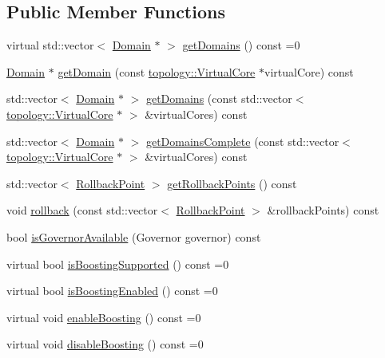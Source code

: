 \subsection*{Public Member Functions}
\begin{DoxyCompactItemize}
\item 
virtual std\-::vector$<$ \hyperlink{classmammut_1_1cpufreq_1_1Domain}{Domain} $\ast$ $>$ \hyperlink{classmammut_1_1cpufreq_1_1CpuFreq_a2ff7cb9b384f506f17340089bba3ba99}{get\-Domains} () const =0
\item 
\hyperlink{classmammut_1_1cpufreq_1_1Domain}{Domain} $\ast$ \hyperlink{classmammut_1_1cpufreq_1_1CpuFreq_aebb8f1ebd1977e817eda907c7107e672}{get\-Domain} (const \hyperlink{classmammut_1_1topology_1_1VirtualCore}{topology\-::\-Virtual\-Core} $\ast$virtual\-Core) const 
\item 
std\-::vector$<$ \hyperlink{classmammut_1_1cpufreq_1_1Domain}{Domain} $\ast$ $>$ \hyperlink{classmammut_1_1cpufreq_1_1CpuFreq_a7cdfd85b4e2d53a0aaee8261be8e3b28}{get\-Domains} (const std\-::vector$<$ \hyperlink{classmammut_1_1topology_1_1VirtualCore}{topology\-::\-Virtual\-Core} $\ast$ $>$ \&virtual\-Cores) const 
\item 
std\-::vector$<$ \hyperlink{classmammut_1_1cpufreq_1_1Domain}{Domain} $\ast$ $>$ \hyperlink{classmammut_1_1cpufreq_1_1CpuFreq_a81175ffbdaa8e4611aa2f550ad358798}{get\-Domains\-Complete} (const std\-::vector$<$ \hyperlink{classmammut_1_1topology_1_1VirtualCore}{topology\-::\-Virtual\-Core} $\ast$ $>$ \&virtual\-Cores) const 
\item 
std\-::vector$<$ \hyperlink{structmammut_1_1cpufreq_1_1RollbackPoint}{Rollback\-Point} $>$ \hyperlink{classmammut_1_1cpufreq_1_1CpuFreq_adf302de171b8c3011ef228f201a71802}{get\-Rollback\-Points} () const 
\item 
void \hyperlink{classmammut_1_1cpufreq_1_1CpuFreq_ac60f3fe79742135c124746e9e357f277}{rollback} (const std\-::vector$<$ \hyperlink{structmammut_1_1cpufreq_1_1RollbackPoint}{Rollback\-Point} $>$ \&rollback\-Points) const 
\item 
bool \hyperlink{classmammut_1_1cpufreq_1_1CpuFreq_a1fb40924ebe83f5840d8586f71696fef}{is\-Governor\-Available} (Governor governor) const 
\item 
virtual bool \hyperlink{classmammut_1_1cpufreq_1_1CpuFreq_a93c7855b33a6794ddb8ba1aa0d4a5496}{is\-Boosting\-Supported} () const =0
\item 
virtual bool \hyperlink{classmammut_1_1cpufreq_1_1CpuFreq_acc8da4a88e11b5e974a4877e2ff1ef95}{is\-Boosting\-Enabled} () const =0
\item 
virtual void \hyperlink{classmammut_1_1cpufreq_1_1CpuFreq_a53f6662c7cf58861d562266c95a61e8c}{enable\-Boosting} () const =0
\item 
virtual void \hyperlink{classmammut_1_1cpufreq_1_1CpuFreq_a8abff63046f3b4ce5b992d4716fdabd1}{disable\-Boosting} () const =0
\end{DoxyCompactItemize}
